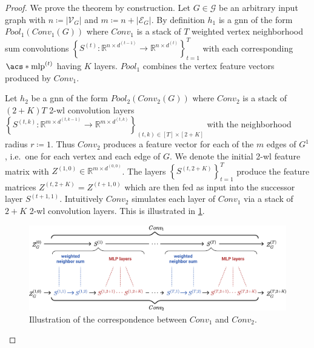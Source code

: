 \begin{proof}
	We prove the theorem by construction.
	Let $G \in \mathcal{G}$ be an arbitrary input graph with $n \coloneqq \left|\mathcal{V}_G\right|$ and $m \coloneqq n + \left|\mathcal{E}_G\right|$.
	By definition $h_1$ is a \ac{gnn} of the form $\mathit{Pool}_1(\mathit{Conv}_1(G))$ where $\mathit{Conv}_1$ is a stack of $T$ weighted vertex neighborhood sum convolutions ${\left\{ S^{(t)}: \mathbb{R}^{n \times d^{(t-1)}} \to \mathbb{R}^{n \times d^{(t)}} \right\}}_{t=1}^T$ with each corresponding $\mathrm{\acs*{mlp}}^{(t)}$ having $K$ layers. %
	$\mathit{Pool}_1$ combines the vertex feature vectors produced by $\mathit{Conv}_1$.

	Let $h_2$ be a \ac{gnn} of the form $\mathit{Pool}_2(\mathit{Conv}_2(G))$ where $\mathit{Conv}_2$ is a stack of $(2 + K) T$ 2-\acs{wl} convolution layers ${\left\{ S^{(t, k)}: \mathbb{R}^{m \times d^{(t,k-1)}} \to \mathbb{R}^{m \times d^{(t,k)}} \right\}}_{(t, k) \in [T] \times [2+K]}$ with the neighborhood radius $r \coloneqq 1$. %
	Thus $\mathit{Conv}_2$ produces a feature vector for each of the $m$ edges of $G^1$, i.e.\ one for each vertex and each edge of $G$.
	We denote the initial 2-\acs{wl} feature matrix with $Z^{(1,0)} \in \mathbb{R}^{m \times d^{(0,0)}}$.
	The layers ${\left\{ S^{(t, 2 + K)} \right\}}_{t=1}^T$ produce the feature matrices $Z^{(t, 2 + K)} = Z^{(t + 1, 0)}$ which are then fed as input into the successor layer $S^{(t + 1, 1)}$. %
	Intuitively $\mathit{Conv}_2$ simulates each layer of $\mathit{Conv}_1$ via a stack of $2 + K$ 2-\acs{wl} convolution layers.
	This is illustrated in \cref{fig:ltd:wl2-simulation}.
	\begin{figure}[ht]
		\centering
		\includegraphics[width=\linewidth]{gfx/ltd/wl2-simulation.pdf}
		\caption[Illustration of a 2-\acs{wl}-\acs{gnn} architecture that simulates vertex neighborhood convolutions.]{
			Illustration of the correspondence between $\mathit{Conv}_1$ and $\mathit{Conv}_2$.
		}\label{fig:ltd:wl2-simulation}
	\end{figure}


\end{proof}
